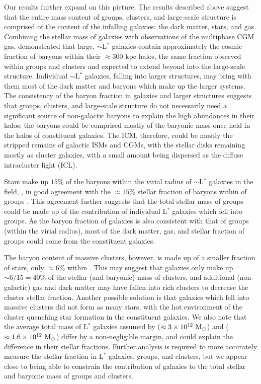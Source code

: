 Our results further expand on this picture. The results described
above suggest that the entire mass content of groups, clusters, and
large-scale structure is comprised of the content of the infalling
galaxies: the dark matter, stars, and gas. Combining the stellar mass
of galaxies with observations of the multiphase CGM gas,
\citet{Werk2014} demonstrated that large, $\sim$L$^*$ galaxies contain
approximately the cosmic fraction of baryons within their $\approx300$
kpc halos, the same fraction observed within groups and clusters and
expected to extend beyond into the large-scale structure. Individual
$\sim$L$^*$ galaxies, falling into larger structures, may bring with
them most of the dark matter and baryons which make up the larger
systems. The consistency of the baryon fraction in galaxies and larger
structures suggests that groups, clusters, and large-scale structure
do not necessarily need a significant source of non-galactic
baryons to explain the high abundances in their halos: the
baryons could be comprised mostly of the baryonic mass once held in
the halos of constituent galaxies. The ICM, therefore, could be mostly
the stripped remains of galactic ISMs and CGMs, with the stellar disks
remaining mostly as cluster galaxies, with a small amount being
dispersed as the diffuse intracluster light (ICL).

Stars make up $15\%$ of the baryons within the virial radius of
$\sim$L$^*$ galaxies in the field, \citep{Werk2014}, in good agreement
with the $\approx15\%$ stellar fraction of baryons within \rvir{} of
groups \citep{Bahcall2014}. This agreement further suggests that the
total stellar mass of groups could be made up of the contribution of
individual L$^*$ galaxies which fell into groups. As the baryon
fraction of galaxies is also consistent with that of groups (within
the virial radius), most of the dark matter, gas, and stellar fraction
of groups could come from the constituent galaxies.

The baryon content of massive clusters, however, is made up of a
smaller fraction of stars, only $\approx6\%$ within \rvir. This may
suggest that galaxies only make up $\sim 6/15 = 40\%$ of the stellar
(and baryonic) mass of clusters, and additional (non-galactic) gas and
dark matter may have fallen into rich clusters to decrease the cluster
stellar fraction. Another possible solution is that galaxies which
fell into massive clusters did not form as many stars, with the hot
environment of the cluster quenching star formation in the constituent
galaxies. We also note that the average total mass of L$^*$ galaxies
assumed by \citet{Bahcall2014} ($\approx 3\times 10^{12}~\textrm{M}_\odot$) and
\citet{Werk2014} ($\approx1.6\times 10^{12}~\textrm{M}_\odot$) differ by a
non-negligible margin, and could explain the difference in their
stellar fractions. Further analysis is required to more accurately
measure the stellar fraction in L$^*$ galaxies, groups, and clusters,
but we appear close to being able to constrain the contribution of
galaxies to the total stellar and baryonic mass of groups and
clusters.

